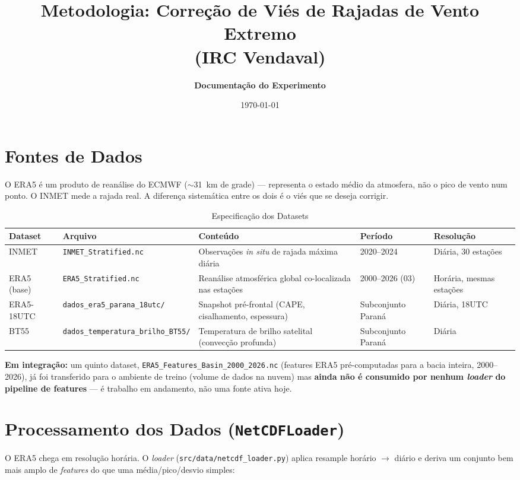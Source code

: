 \documentclass[11pt,a4paper]{article}
\title{\textbf{Metodologia: Correção de Viés de Rajadas de Vento Extremo\\(IRC Vendaval)}}
\author{\textbf{Documentação do Experimento}}
\date{\today}
\begin{document}
\maketitle

\section{Fontes de Dados}
O ERA5 é um produto de reanálise do ECMWF ($\sim$31~km de grade) --- representa o estado médio da atmosfera, não o pico de vento num ponto. O INMET mede a rajada real. A diferença sistemática entre os dois é o viés que se deseja corrigir.

\begin{table}[h]
\centering
\caption{Especificação dos Datasets}
\vspace{2mm}
\begin{tabularx}{\textwidth}{llllX}
\toprule
\textbf{Dataset} & \textbf{Arquivo} & \textbf{Conteúdo} & \textbf{Período} & \textbf{Resolução} \\
\midrule
INMET & \texttt{INMET\_Stratified.nc} & Observações \textit{in situ} de rajada máxima diária & 2020--2024 & Diária, 30 estações \\
ERA5 (base) & \texttt{ERA5\_Stratified.nc} & Reanálise atmosférica global co-localizada nas estações & 2000--2026 (03) & Horária, mesmas estações \\
ERA5-18UTC & \texttt{dados\_era5\_parana\_18utc/} & Snapshot pré-frontal (CAPE, cisalhamento, espessura) & Subconjunto Paraná & Diária, 18UTC \\
BT55 & \texttt{dados\_temperatura\_brilho\_BT55/} & Temperatura de brilho satelital (convecção profunda) & Subconjunto Paraná & Diária \\
\bottomrule
\end{tabularx}
\end{table}

\noindent \textbf{Em integração:} um quinto dataset, \texttt{ERA5\_Features\_Basin\_2000\_2026.nc} (features ERA5 pré-computadas para a bacia inteira, 2000--2026), já foi transferido para o ambiente de treino (volume de dados na nuvem) mas \textbf{ainda não é consumido por nenhum \textit{loader} do pipeline de features} --- é trabalho em andamento, não uma fonte ativa hoje.

\section{Processamento dos Dados (\texttt{NetCDFLoader})}
O ERA5 chega em resolução horária. O \textit{loader} (\texttt{src/data/netcdf\_loader.py}) aplica resample horário $\rightarrow$ diário e deriva um conjunto bem mais amplo de \textit{features} do que uma média/pico/desvio simples:
\end{document}
